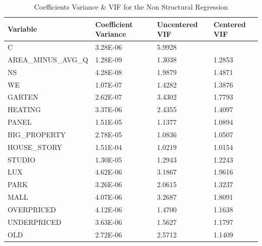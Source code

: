 \documentclass[]{article}
\begin{document}
\begin{table}[H]
	\centering
	\caption{Coefficients Variance \& VIF for the Non Structural Regression}
	\label{tab:coef_vif}
	\begin{tabular}{@{}llll@{}}
		\hline
		\textbf{Variable}            & \textbf{Coefficient Variance} & \textbf{Uncentered VIF} & \textbf{Centered VIF} \\ \hline
		C                   & 3.28E-06    & 5.9928     &          \\
		AREA\_MINUS\_AVG\_Q & 1.28E-09    & 1.3038     & 1.2853   \\
		NS                  & 4.28E-08    & 1.9879     & 1.4871   \\
		WE                  & 1.07E-07    & 1.4282     & 1.3876   \\
		GARTEN              & 2.62E-07    & 3.4302     & 1.7793   \\
		HEATING             & 3.37E-06    & 2.4355     & 1.4097   \\
		PANEL               & 1.51E-05    & 1.1377     & 1.0894   \\
		BIG\_PROPERTY       & 2.78E-05    & 1.0836     & 1.0507   \\
		HOUSE\_STORY        & 1.51E-04    & 1.0219     & 1.0154   \\
		STUDIO              & 1.30E-05    & 1.2943     & 1.2243   \\
		LUX                 & 4.62E-06    & 3.1867     & 1.9616   \\
		PARK                & 3.26E-06    & 2.0615     & 1.3237   \\
		MALL                & 4.07E-06    & 3.2687     & 1.8091   \\
		OVERPRICED          & 4.12E-06    & 1.4700     & 1.1638   \\
		UNDERPRICED         & 3.63E-06    & 1.5627     & 1.1797   \\
		OLD                 & 2.72E-06    & 2.5712     & 1.1409   \\ \hline
	\end{tabular}
\end{table}
\end{document}
